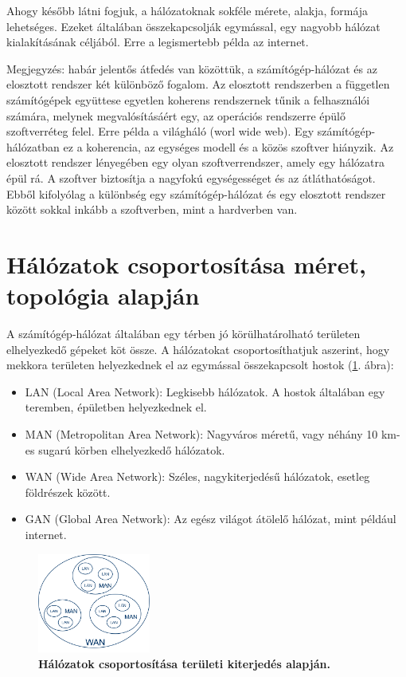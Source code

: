 \documentclass[12pt]{article}
\theoremstyle{plain}
\begin{document}
\par
\medskip
Ahogy később látni fogjuk, a hálózatoknak sokféle mérete, alakja, formája lehetséges. Ezeket általában összekapcsolják egymással, egy nagyobb hálózat kialakításának céljából. Erre a legismertebb példa az internet. 
\par
\medskip
Megjegyzés: habár jelentős átfedés van közöttük, a számítógép-hálózat és az elosztott rendszer két különböző fogalom. Az elosztott rendszerben a független számítógépek együttese egyetlen koherens rendszernek tűnik a felhasználói számára, melynek megvalósításáért egy, az operációs rendszerre épülő szoftverréteg felel. Erre példa a világháló (worl wide web). Egy számítógép-hálózatban ez a koherencia, az egységes modell és a közös szoftver hiányzik. Az elosztott rendszer lényegében egy olyan szoftverrendszer, amely egy hálózatra épül rá. A szoftver biztosítja a nagyfokú egységességet és az átláthatóságot. Ebből kifolyólag a különbség egy számítógép-hálózat és egy elosztott rendszer között sokkal inkább a szoftverben, mint a hardverben van.

\section{Hálózatok csoportosítása méret, topológia alapján}

A számítógép-hálózat általában egy térben jó körülhatárolható területen elhelyezkedő gépeket köt össze. A hálózatokat csoportosíthatjuk aszerint, hogy mekkora területen helyezkednek el az egymással összekapcsolt hostok (\ref{fig:size}. ábra):
\begin{itemize}
    \item LAN (Local Area Network): Legkisebb hálózatok. A hostok általában egy teremben, épületben helyezkednek el.
    \item MAN (Metropolitan Area Network): Nagyváros méretű, vagy néhány 10 km-es sugarú körben elhelyezkedő hálózatok.
    \item WAN (Wide Area Network): Széles, nagykiterjedésű hálózatok, esetleg földrészek között.
    \item GAN (Global Area Network): Az egész világot átölelő hálózat, mint például internet.
\end{itemize}{}

\begin{figure}[H]
    \begin{center}
    \includegraphics[width=0.33\textwidth]{media/size.png}
    \caption{\textbf{Hálózatok csoportosítása területi kiterjedés alapján.}} 
    \label{fig:size}
    \end{center}
\end{figure}
\end{document}
